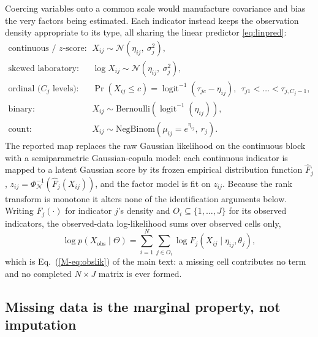 \documentclass[11pt]{article}
\theoremstyle{plain}
\theoremstyle{definition}
\newcommand{\MEq}[1]{Eq.~(\ref{M-#1})}
\begin{document}
Coercing variables onto a common scale would manufacture covariance and bias the very
factors being estimated. Each indicator instead keeps the observation density appropriate
to its type, all sharing the linear predictor \eqref{eq:linpred}:
\begin{align}
  \text{continuous / $z$-score:}\quad & X_{ij}\sim \mathcal{N}(\eta_{ij},\ \sigma_j^2),
  \label{eq:fam-gauss}\\
  \text{skewed laboratory:}\quad & \log X_{ij}\sim \mathcal{N}(\eta_{ij},\ \sigma_j^2), \\
  \text{ordinal ($C_j$ levels):}\quad & \Pr(X_{ij}\le c)
  =\operatorname{logit}^{-1}(\tau_{jc}-\eta_{ij}),\ \ \tau_{j1}<\dots<\tau_{j,C_j-1},
  \label{eq:fam-ord}\\
  \text{binary:}\quad & X_{ij}\sim \mathrm{Bernoulli}\!\left(\operatorname{logit}^{-1}(\eta_{ij})\right),
  \label{eq:fam-bern}\\
  \text{count:}\quad & X_{ij}\sim \mathrm{NegBinom}\!\left(\mu_{ij}=e^{\eta_{ij}},\ r_j\right).
  \label{eq:fam-count}
\end{align}
The reported map replaces the raw Gaussian likelihood on the continuous block with a
semiparametric Gaussian-copula model: each continuous indicator is mapped to a latent
Gaussian score by its frozen empirical distribution function
$\hat F_j$, $z_{ij}=\Phi_{\mathcal N}^{-1}(\hat F_j(X_{ij}))$, and the factor model is fit
on $z_{ij}$. Because the rank transform is monotone it alters none of the identification
arguments below. Writing $F_j(\cdot)$ for indicator $j$'s density and
$O_i\subseteq\{1,\dots,J\}$ for its observed indicators, the observed-data log-likelihood
sums over observed cells only,
\begin{equation}
  \log p(X_{\mathrm{obs}}\mid\Theta)=\sum_{i=1}^{N}\sum_{j\in O_i}
  \log F_j\!\left(X_{ij}\mid\eta_{ij},\theta_j\right),
  \label{eq:obslik}
\end{equation}
which is \MEq{eq:obslik} of the main text: a missing cell contributes no term and no
completed $N\times J$ matrix is ever formed.

\subsection{Missing data is the marginal property, not imputation}
\label{sub:missing}
\end{document}
